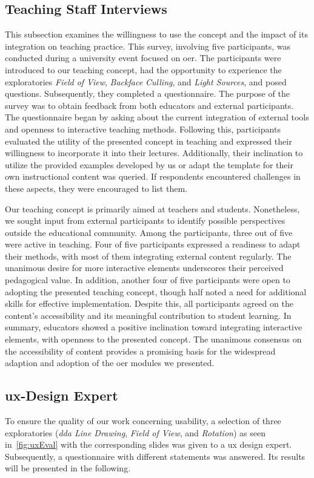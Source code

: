 \subsection{Teaching Staff Interviews}%
This subsection examines the willingness to use the concept and the impact of its integration on teaching practice. This survey, involving five participants, was conducted during a university event focused on \acrshort{oer}. The participants were introduced to our teaching concept, had the opportunity to experience the exploratories \emph{Field of View}, \emph{Backface Culling}, and \emph{Light Sources}, and posed questions. Subsequently, they completed a questionnaire.
The purpose of the survey was to obtain feedback from both educators and external participants. The questionnaire began by asking about the current integration of external tools and openness to interactive teaching methods. Following this, participants evaluated the utility of the presented concept in teaching and expressed their willingness to incorporate it into their lectures. Additionally, their inclination to utilize the provided examples developed by us or adapt the template for their own instructional content was queried. If respondents encountered challenges in these aspects, they were encouraged to list them.

Our teaching concept is primarily aimed at teachers and students. Nonetheless, we sought input from external participants to identify possible perspectives outside the educational community. Among the participants, three out of five were active in teaching. Four of five participants expressed a readiness to adapt their methods, with most of them integrating external content regularly. The unanimous desire for more interactive elements underscores their perceived pedagogical value.
In addition, another four of five participants were open to adopting the presented teaching concept, though half noted a need for additional skills for effective implementation. Despite this, all participants agreed on the content's accessibility and its meaningful contribution to student learning.
In summary, educators showed a positive inclination toward integrating interactive elements, with openness to the presented concept. The unanimous consensus on the accessibility of content provides a promising basis for the widespread adaption and adoption of the \acrshort{oer} modules we presented.


\subsection{\acrshort{ux}-Design Expert} %
To ensure the quality of our work concerning usability, a selection of three exploratories (\emph{\acrshort{dda} Line Drawing}, \emph{Field of View}, and \emph{Rotation}) as seen in~\autoref{fig:uxEval} with the corresponding slides was given to a \acrfull{ux} design expert. Subsequently, a questionnaire with different statements was answered. Its results will be presented in the following.

